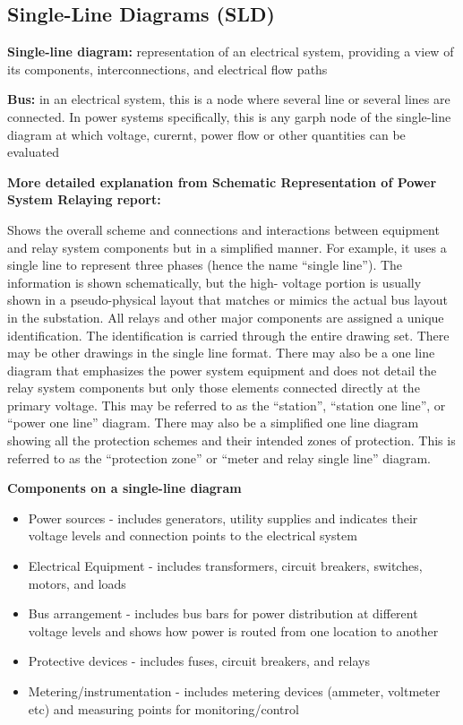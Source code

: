 \subsection{Single-Line Diagrams (SLD)}

\begin{define}
    \textbf{Single-line diagram:} representation of an electrical system, providing a view of its components, interconnections, and electrical flow paths

    \textbf{Bus:} in an electrical system, this is a node where several line or several lines are connected. In power systems specifically, this is any garph node of the single-line diagram at which voltage, curernt, power flow or other quantities can be evaluated
\end{define}
\textbf{More detailed explanation from Schematic Representation of Power System Relaying report:}

Shows the overall scheme and connections and interactions between equipment and relay system components but in a simplified manner. For example, it uses a single line to represent three phases (hence the name “single line”). The information is shown schematically, but the high- voltage portion is usually shown in a pseudo-physical layout that matches or mimics the actual bus layout in the substation. All relays and other major components are assigned a unique identification. The identification is carried through the entire drawing set. There may be other drawings in the single line format. There may also be a one line diagram that emphasizes the power system equipment and does not detail the relay system components but only those elements connected directly at the primary voltage. This may be referred to as the “station”, “station one line”, or “power one line” diagram. There may also be a simplified one line diagram showing all the protection schemes and their intended zones of protection. This is referred to as the “protection zone” or “meter and relay single line” diagram.

\textbf{Components on a single-line diagram}
\begin{itemize}
    \item Power sources - includes generators, utility supplies and indicates their voltage levels and connection points to the electrical system
    \item Electrical Equipment - includes transformers, circuit breakers, switches, motors, and loads
    \item Bus arrangement - includes bus bars for power distribution at different voltage levels and shows how power is routed from one location to another
    \item Protective devices - includes fuses, circuit breakers, and relays
    \item Metering/instrumentation - includes metering devices (ammeter, voltmeter etc) and measuring points for monitoring/control
\end{itemize}

